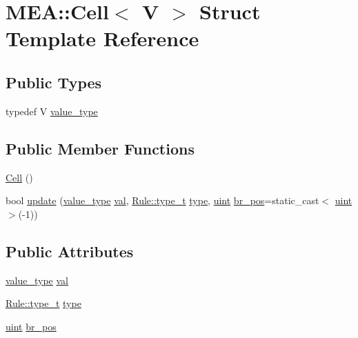 \hypertarget{struct_m_e_a_1_1_cell}{\section{M\+E\+A\+:\+:Cell$<$ V $>$ Struct Template Reference}
\label{struct_m_e_a_1_1_cell}
}
\subsection*{Public Types}
\begin{DoxyCompactItemize}
\item 
typedef V \hyperlink{struct_m_e_a_1_1_cell_abe9d3f79ff7f6951f63c1101ebb4e0b1}{value\+\_\+type}
\end{DoxyCompactItemize}
\subsection*{Public Member Functions}
\begin{DoxyCompactItemize}
\item 
\hyperlink{struct_m_e_a_1_1_cell_a8df3b0f3febf66a97bdead49c05c7233}{Cell} ()
\item 
bool \hyperlink{struct_m_e_a_1_1_cell_ace3821dbc37988767ebbcc07bce21735}{update} (\hyperlink{struct_m_e_a_1_1_cell_abe9d3f79ff7f6951f63c1101ebb4e0b1}{value\+\_\+type} \hyperlink{struct_m_e_a_1_1_cell_a2561f0900802700778a51698ba33ee57}{val}, \hyperlink{namespace_rule_a19cb2a2fcfb640a8dce289e3d476923d}{Rule\+::type\+\_\+t} \hyperlink{struct_m_e_a_1_1_cell_a3f39a9889767a12ffd09c9d4ec0722b5}{type}, \hyperlink{cyktable_8h_a91ad9478d81a7aaf2593e8d9c3d06a14}{uint} \hyperlink{struct_m_e_a_1_1_cell_a28c611efa289efb253ea635f394576f1}{br\+\_\+pos}=static\+\_\+cast$<$ \hyperlink{cyktable_8h_a91ad9478d81a7aaf2593e8d9c3d06a14}{uint} $>$(-\/1))
\end{DoxyCompactItemize}
\subsection*{Public Attributes}
\begin{DoxyCompactItemize}
\item 
\hyperlink{struct_m_e_a_1_1_cell_abe9d3f79ff7f6951f63c1101ebb4e0b1}{value\+\_\+type} \hyperlink{struct_m_e_a_1_1_cell_a2561f0900802700778a51698ba33ee57}{val}
\item 
\hyperlink{namespace_rule_a19cb2a2fcfb640a8dce289e3d476923d}{Rule\+::type\+\_\+t} \hyperlink{struct_m_e_a_1_1_cell_a3f39a9889767a12ffd09c9d4ec0722b5}{type}
\item 
\hyperlink{cyktable_8h_a91ad9478d81a7aaf2593e8d9c3d06a14}{uint} \hyperlink{struct_m_e_a_1_1_cell_a28c611efa289efb253ea635f394576f1}{br\+\_\+pos}
\end{DoxyCompactItemize}


